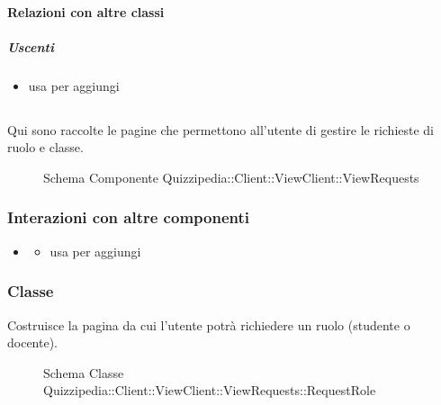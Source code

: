 \paragraph{Relazioni con altre classi}
\subparagraph{Uscenti}
\begin{itemize}
\item usa  per aggiungi
\end{itemize}
\subsection{}
Qui sono raccolte le pagine che permettono all'utente di gestire le richieste di ruolo e classe.
\begin{figure}[H]
\centering
\noindent{}
\caption[Schema Componente Quizzipedia::Client::ViewClient::ViewRequests]{Schema Componente Quizzipedia::Client::ViewClient::ViewRequests}
\end{figure}
\subsubsection{Interazioni con altre componenti}
\begin{itemize}
\item {}
\begin{itemize}
\item usa  per aggiungi
\end{itemize}
\end{itemize}
\subsubsection{Classe }
Costruisce la pagina da cui l'utente potrà richiedere un ruolo (studente o docente).
\begin{figure}[H]
\centering
\noindent{}
\caption[Schema Classe RequestRole]{Schema Classe Quizzipedia::Client::ViewClient::ViewRequests::RequestRole}
\end{figure}
